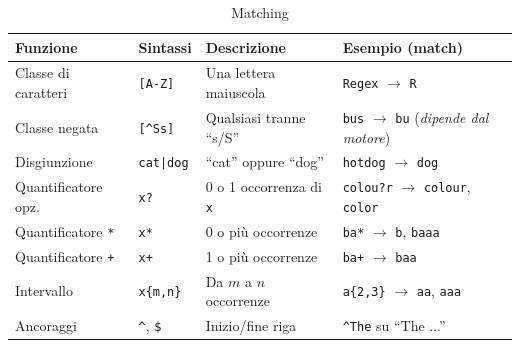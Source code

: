         \begin{table}[h]
            \centering
            
            \begin{tabular}{@{}llll@{}}
            
                \toprule
                
                \textbf{Funzione} & \textbf{Sintassi} & \textbf{Descrizione} & \textbf{Esempio (match)} \\
                
                \midrule
                
                Classe di caratteri & \texttt{[A-Z]} & Una lettera maiuscola & \texttt{Regex} $\to$ \texttt{R} \\
                
                Classe negata & \texttt{[\^{}Ss]} & Qualsiasi tranne ``s/S'' & \texttt{bus} $\to$ \texttt{bu} (\emph{dipende dal motore}) \\
               
                Disgiunzione & \texttt{cat|dog} & ``cat'' oppure ``dog'' & \texttt{hotdog} $\to$ \texttt{dog} \\
                
                Quantificatore opz. & \texttt{x?} & 0 o 1 occorrenza di \texttt{x} & \texttt{colou?r} $\to$ \texttt{colour}, \texttt{color} \\
                
                Quantificatore \texttt{*} & \texttt{x*} & 0 o più occorrenze & \texttt{ba*} $\to$ \texttt{b}, \texttt{baaa} \\
                
                Quantificatore \texttt{+} & \texttt{x+} & 1 o più occorrenze & \texttt{ba+} $\to$ \texttt{baa} \\
                
                Intervallo & \texttt{x\{m,n\}} & Da $m$ a $n$ occorrenze & \texttt{a\{2,3\}} $\to$ \texttt{aa}, \texttt{aaa} \\
                Ancoraggi & \texttt{\textasciicircum}, \texttt{\$} & 
                
                Inizio/fine riga & \texttt{\textasciicircum The} su ``The ...'' \\
                
                \bottomrule
                
            \end{tabular}

            \caption{Matching}
        \end{table}

